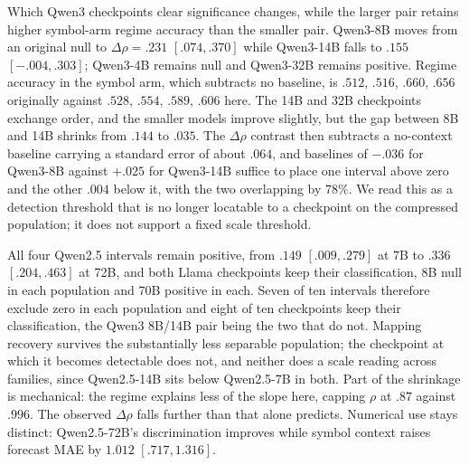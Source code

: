 \begin{center}
\begin{minipage}{\linewidth}
\centering
{}
\label{tab:coin-city-generator-robustness}
\scriptsize
\setlength{\tabcolsep}{2.5pt}
\resizebox{\linewidth}{!}{}
\end{minipage}
\end{center}

Which Qwen3 checkpoints clear significance changes, while the larger pair retains
higher symbol-arm regime accuracy than the smaller pair.
Qwen3-8B moves from an original null to \(\Delta\rho=.231\) \([.074,.370]\) while
Qwen3-14B falls to \(.155\) \([-.004,.303]\); Qwen3-4B remains null and Qwen3-32B
remains positive. Regime accuracy in the symbol arm, which subtracts no baseline,
is \(.512\), \(.516\), \(.660\), \(.656\) originally against \(.528\),
\(.554\), \(.589\), \(.606\) here. The 14B and 32B checkpoints exchange order,
and the smaller models improve slightly, but the gap between 8B and 14B shrinks
from \(.144\) to \(.035\).
The \(\Delta\rho\) contrast then subtracts a no-context baseline carrying a
standard error of about \(.064\), and baselines of \(-.036\) for Qwen3-8B against
\(+.025\) for Qwen3-14B suffice to place one interval above zero and the other
\(.004\) below it, with the two overlapping by \(78\%\). We read this as a
detection threshold that is no longer locatable to a checkpoint on the compressed
population; it does not support a fixed scale threshold.

All four Qwen2.5 intervals remain positive, from \(.149\) \([.009,.279]\) at 7B to
\(.336\) \([.204,.463]\) at 72B, and both Llama checkpoints keep their
classification, 8B null in each population and 70B positive in each. Seven of ten
intervals therefore exclude zero in each population and eight of ten checkpoints
keep their classification, the Qwen3 8B/14B pair being the two that do not. Mapping
recovery survives the substantially less separable population; the checkpoint at
which it becomes detectable does not, and neither does a scale reading across
families, since Qwen2.5-14B sits below Qwen2.5-7B in both. Part of the shrinkage
is mechanical: the regime explains less of the slope here, capping \(\rho\) at
\(.87\) against \(.996\). The observed \(\Delta\rho\) falls further than that alone
predicts. Numerical use stays distinct:
Qwen2.5-72B's discrimination improves while symbol context raises forecast MAE by
\(1.012\) \([.717,1.316]\).


